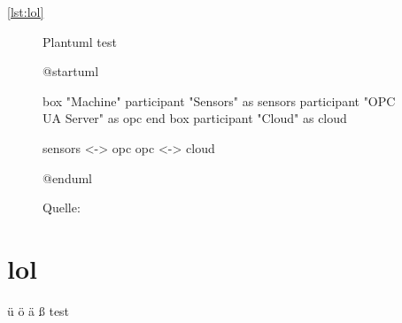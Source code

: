 \documentclass[%
    debug           = true,
    auto-generate   = true,
    print-ndn       = true,
    plantuml        = true
]{udhbwvst}
\begin{document}


\autoref{lst:lol}

\blindtext

\begin{figure}[h]
    \centering
    \caption{Plantuml test}
    \begin{plantuml}
        @startuml

        box "Machine"
            participant "Sensors" as sensors
            participant "OPC UA Server" as opc
        end box
        participant "Cloud" as cloud

        sensors <-> opc
        opc <-> cloud

        @enduml    
    \end{plantuml}
    \caption*{\footnotesize{Quelle: }}
    \label{fig:plantuml_test}
\end{figure}

\section{lol}

ü ö ä ß test
\end{document}
